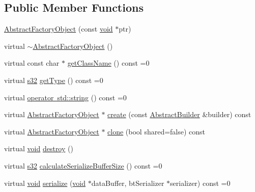 \subsection*{Public Member Functions}
\begin{DoxyCompactItemize}
\item 
\mbox{\hyperlink{classnjli_1_1_abstract_factory_object_ad8a2eaf0b14375ad9739a8968429739e}{Abstract\+Factory\+Object}} (const \mbox{\hyperlink{_thread_8h_af1e856da2e658414cb2456cb6f7ebc66}{void}} $\ast$ptr)
\item 
virtual \mbox{\hyperlink{classnjli_1_1_abstract_factory_object_a23b7edad5e21229d9f9f14359dd3ec46}{$\sim$\+Abstract\+Factory\+Object}} ()
\item 
virtual const char $\ast$ \mbox{\hyperlink{classnjli_1_1_abstract_factory_object_af4151e41b80d5bc3fc42822c67fc2278}{get\+Class\+Name}} () const =0
\item 
virtual \mbox{\hyperlink{_util_8h_aa62c75d314a0d1f37f79c4b73b2292e2}{s32}} \mbox{\hyperlink{classnjli_1_1_abstract_factory_object_a207c86146d40d0794708ae7f2d4e60a7}{get\+Type}} () const =0
\item 
virtual \mbox{\hyperlink{classnjli_1_1_abstract_factory_object_a838f4fa7e65cace6098aab5222892942}{operator std\+::string}} () const =0
\item 
virtual \mbox{\hyperlink{classnjli_1_1_abstract_factory_object}{Abstract\+Factory\+Object}} $\ast$ \mbox{\hyperlink{classnjli_1_1_abstract_factory_object_a83a8876ae63b92804004cf3febe76573}{create}} (const \mbox{\hyperlink{classnjli_1_1_abstract_builder}{Abstract\+Builder}} \&builder) const
\item 
virtual \mbox{\hyperlink{classnjli_1_1_abstract_factory_object}{Abstract\+Factory\+Object}} $\ast$ \mbox{\hyperlink{classnjli_1_1_abstract_factory_object_a6236ab8114b3f3033bc9824b0980b055}{clone}} (bool shared=false) const
\item 
virtual \mbox{\hyperlink{_thread_8h_af1e856da2e658414cb2456cb6f7ebc66}{void}} \mbox{\hyperlink{classnjli_1_1_abstract_factory_object_afec18dff52178eaf73a64764c262d95a}{destroy}} ()
\item 
virtual \mbox{\hyperlink{_util_8h_aa62c75d314a0d1f37f79c4b73b2292e2}{s32}} \mbox{\hyperlink{classnjli_1_1_abstract_factory_object_a4763d05bc9dc37c559111f8bb30e1dd8}{calculate\+Serialize\+Buffer\+Size}} () const =0
\item 
virtual \mbox{\hyperlink{_thread_8h_af1e856da2e658414cb2456cb6f7ebc66}{void}} \mbox{\hyperlink{classnjli_1_1_abstract_factory_object_aad2fbe86fb3bdecf02918a96b9c57976}{serialize}} (\mbox{\hyperlink{_thread_8h_af1e856da2e658414cb2456cb6f7ebc66}{void}} $\ast$data\+Buffer, bt\+Serializer $\ast$serializer) const =0

\end{DoxyCompactItemize}
